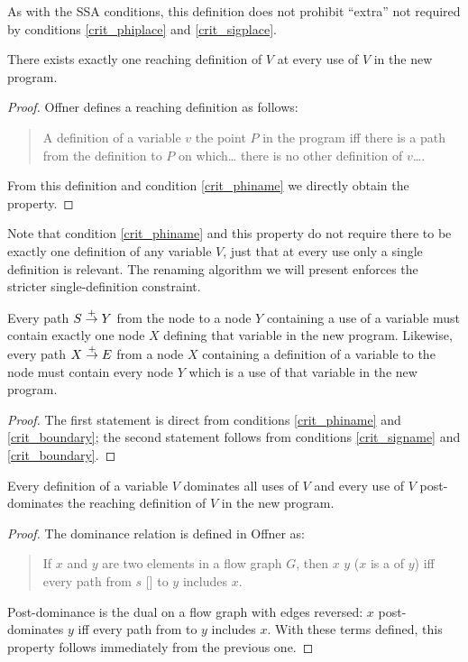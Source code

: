 \documentclass[12pt,titlepage,twoside]{article}
\begin{document}
As with the SSA conditions, this definition does not prohibit
``extra''  not required by conditions
\ref{crit_phiplace} and \ref{crit_sigplace}.

\begin{property}
There exists exactly one reaching definition of $V$ at every use of
$V$ in the new program.
\end{property}
\begin{proof}
Offner \cite{offner95} defines a reaching definition as follows:
\begin{quote}
A definition of a variable $v$  the point $P$ in the
program iff there is a path from the definition to $P$ on which\ldots
there is no other definition of $v$\ldots.
\end{quote}
From this definition and condition \ref{crit_phiname} we directly
obtain the property.
\end{proof}

Note that condition \ref{crit_phiname} and this property do not require
there to be exactly one definition of any variable $V$, just that at
every use only a single definition is relevant.  The renaming
algorithm we will present enforces the stricter single-definition
constraint.

\begin{property}
Every path $S \stackrel{+}{\rightarrow} Y$ from the  node to a node $Y$
containing a use of a variable must contain exactly one node $X$
defining that variable in the new program.  Likewise, every path $X
\stackrel{+}{\rightarrow} E$ from a node $X$ containing a definition of a variable to
the  node must contain every node $Y$ which is a use of that
variable in the new program.
\end{property}
\begin{proof}
The first statement is direct from conditions \ref{crit_phiname} and
\ref{crit_boundary}; the second statement follows from conditions
\ref{crit_signame} and \ref{crit_boundary}.
\end{proof}

\begin{property}
Every definition of a variable $V$ dominates all uses of $V$ and
every use of $V$ post-dominates the reaching definition of $V$ in the
new program.
\end{property}
\begin{proof}
The dominance relation is defined in Offner \cite{offner95} as:
\begin{quote}
If $x$ and $y$ are two elements in a flow graph $G$, then $x$
 $y$ ($x$ is a  of $y$) iff
every path from $s$ [] to $y$ includes $x$.
\end{quote}
Post-dominance is the dual on a flow graph with edges reversed: $x$
post-dominates $y$ iff every path from  to $y$ includes $x$.
With these terms defined, this property follows immediately from the
previous one.
\end{proof}
\end{document}
